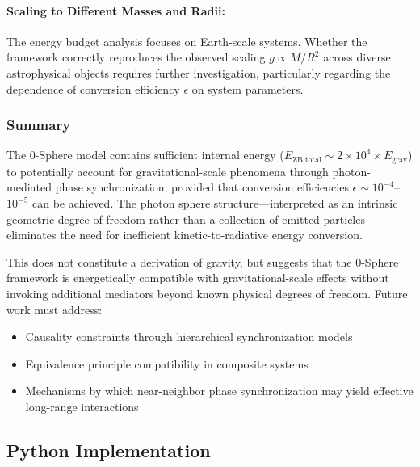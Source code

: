 \documentclass[
 reprint,
 amsmath,amssymb,
 aps,
 prb,
]{revtex4-2}
\numberwithin{equation}{section}
\begin{document}
\vspace{0.5cm}

\paragraph{Scaling to Different Masses and Radii:}
The energy budget analysis focuses on Earth-scale systems. Whether the framework correctly reproduces the observed scaling $g \propto M/R^2$ across diverse astrophysical objects requires further investigation, particularly regarding the dependence of conversion efficiency $\epsilon$ on system parameters.

\subsubsection{Summary}

The 0-Sphere model contains sufficient internal energy ($E_{\text{ZB,total}} \sim 2 \times 10^4 \times E_{\text{grav}}$) to potentially account for gravitational-scale phenomena through photon-mediated phase synchronization, provided that conversion efficiencies $\epsilon \sim 10^{-4}$--$10^{-5}$ can be achieved. The photon sphere structure—interpreted as an intrinsic geometric degree of freedom rather than a collection of emitted particles—eliminates the need for inefficient kinetic-to-radiative energy conversion.

This does not constitute a derivation of gravity, but suggests that the 0-Sphere framework is energetically compatible with gravitational-scale effects without invoking additional mediators beyond known physical degrees of freedom. Future work must address:

\begin{itemize}
\item Causality constraints through hierarchical synchronization models
\item Equivalence principle compatibility in composite systems
\item Mechanisms by which near-neighbor phase synchronization may yield effective long-range interactions
\end{itemize}

\subsection{Python Implementation}
\label{app:code}
\end{document}
